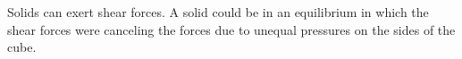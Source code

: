 Solids can exert shear forces. A solid could be
in an equilibrium in which the shear forces were canceling the forces due to
unequal pressures on the sides of the cube.



